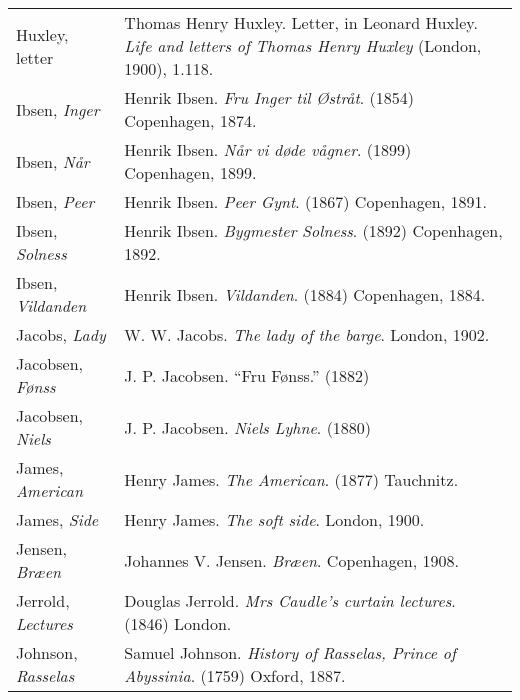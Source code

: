 \begin{longtable}{p{} p{}}
Huxley, letter & Thomas Henry Huxley. Letter, in Leonard Huxley. \textit{Life and letters of Thomas Henry Huxley} (London, 1900), 1.118.\\

Ibsen, \textit{Inger} & Henrik Ibsen. \textit{Fru Inger til Østråt}. (1854) Copenhagen, 1874. \\
Ibsen, \textit{Når} & Henrik Ibsen. \textit{Når vi døde vågner}. (1899) Copenhagen, 1899. \\
Ibsen, \textit{Peer} & Henrik Ibsen. \textit{Peer Gynt}. (1867) Copenhagen, 1891. \\
Ibsen, \textit{Solness} & Henrik Ibsen. \textit{Bygmester Solness}. (1892) Copenhagen, 1892. \\
Ibsen, \textit{Vildanden} & Henrik Ibsen. \textit{Vildanden}. (1884) Copenhagen, 1884. \\

Jacobs, \textit{Lady} & W. W. Jacobs. \textit{The lady of the barge}. London, 1902. \\

Jacobsen, \textit{Fønss} & J. P. Jacobsen. ``Fru Fønss.'' (1882) \\
Jacobsen, \textit{Niels} & J. P. Jacobsen. \textit{Niels Lyhne}. (1880) \\

James, \textit{American} & Henry James. \textit{The American}. (1877) Tauchnitz. \\
James, \textit{Side} & Henry James. \textit{The soft side}. London, 1900.  \\

Jensen, \textit{Bræen} & Johannes V. Jensen. \textit{Bræen}. Copenhagen, 1908.\\

Jerrold, \textit{Lectures} & Douglas Jerrold. \textit{Mrs Caudle's curtain lectures}. (1846) London. \\
%

Johnson, \textit{Rasselas} & Samuel Johnson. \textit{History of Rasselas, Prince of Abyssinia}. (1759) Oxford, 1887.  \\
%


\end{longtable}
